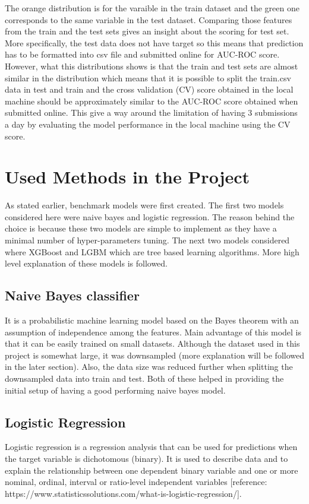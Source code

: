 \documentclass[journal,twoside,web]{ieeecolor}
\begin{document}
The orange distribution is for the varaible in the train dataset and the green one corresponds to the same variable in the test dataset. Comparing those features from the train and the test sets gives an insight about the scoring for test set. More specifically, the test data does not have target so this means that prediction has to be formatted into csv file and submitted online for AUC-ROC score. However, what this distributions shows is that the train and test sets are almost similar in the distribution which means that it is possible to split the train.csv data in test and train and the cross validation (CV) score obtained in the local machine should be approximately similar to the AUC-ROC score obtained when submitted online. This give a way around the limitation of having 3 submissions a day by evaluating the model performance in the local machine using the CV score. 



\section{Used Methods in the Project}
As stated earlier, benchmark models were first created. The first two models considered here were naive bayes and logistic regression. The reason behind the choice is because these two models are simple to implement as they have a minimal number of hyper-parameters tuning. The next two models considered where XGBoost and LGBM which are tree based learning algorithms. More high level explanation of these models is followed.  

\subsection{Naive Bayes classifier}
It is a probabilistic machine learning model based on the Bayes theorem with an assumption of independence among the features. Main advantage of this model is that it can be easily trained on small datasets. Although the dataset used in this project is somewhat large, it was downsampled (more explanation will be followed in the later section). Also, the data size was reduced further when splitting the downsampled data into train and test. Both of these helped in providing the initial setup of having a good performing naive bayes model. 

\subsection{Logistic Regression}
Logistic regression is a regression analysis that can be used for predictions when the target variable is dichotomous (binary). It is used to describe data and to explain the relationship between one dependent binary variable and one or more nominal, ordinal, interval or ratio-level independent variables [reference: https://www.statisticssolutions.com/what-is-logistic-regression/].
\end{document}
